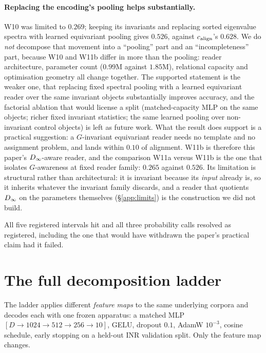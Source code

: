 \paragraph{Replacing the encoding's pooling helps substantially.} W10 was limited to $0.269$;
keeping its invariants and replacing sorted eigenvalue spectra with learned equivariant pooling
gives $0.526$, against $c_{\mathrm{align}}$'s $0.628$. We do \emph{not} decompose that movement into a
``pooling'' part and an ``incompleteness'' part, because W10 and W11b differ in more than the
pooling: reader architecture, parameter count ($0.99$M against $1.85$M), relational capacity and
optimisation geometry all change together. The supported statement is the weaker one, that replacing
fixed spectral pooling with a learned equivariant reader over the same invariant objects
substantially improves accuracy, and the factorial ablation that would license a split
(matched-capacity MLP on the same objects; richer fixed invariant statistics; the same learned
pooling over non-invariant control objects) is left as future work. What the result does support is
a practical suggestion: a $G$-invariant equivariant reader needs no template and no assignment
problem, and lands within $0.10$ of alignment. W11b is therefore this paper's $D_\infty$-aware reader,
and the comparison W11a versus W11b is the one that isolates $G$-awareness at fixed reader family: $0.265$ against $0.526$. Its limitation is structural rather than architectural: it is invariant
because its \emph{input} already is, so it inherits whatever the invariant family discards, and a
reader that quotients $D_\infty$ on the parameters themselves (\S\ref{app:limits}) is the construction
we did not build.

All five registered intervals hit and all three probability calls resolved as registered, including
the one that would have withdrawn the paper's practical claim had it failed.


\section{The full decomposition ladder}\label{app:ladder}

The ladder applies different \emph{feature maps} to the same underlying corpora and decodes each
with one frozen apparatus: a matched MLP $[D \to 1024 \to 512 \to 256 \to 10]$, GELU, dropout
$0.1$, AdamW $10^{-3}$, cosine schedule, early stopping on a held-out INR validation split. Only
the feature map changes.

